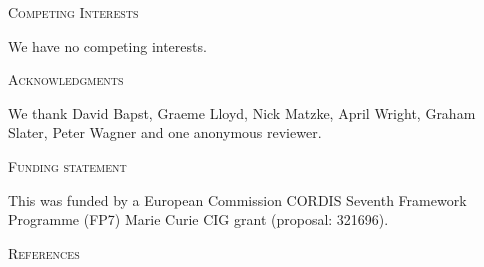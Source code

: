 \documentclass[12pt,letterpaper]{article}
\renewcommand{\section}[1]{%
\bigskip
\begin{center}
\begin{Large}
\normalfont\scshape #1
\medskip
\end{Large}
\end{center}}
\begin{document}
\section{Competing Interests}
We have no competing interests.
\section{Acknowledgments}
We thank David Bapst, Graeme Lloyd, Nick Matzke, April Wright, Graham Slater, Peter Wagner and one anonymous reviewer.
\section{Funding statement}
This was funded by a European Commission CORDIS Seventh Framework Programme (FP7) Marie Curie CIG grant (proposal: 321696).

\section{References}




\end{document}
